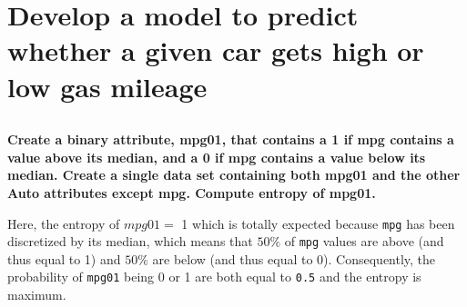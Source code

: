 \documentclass[
  12pt,
  oneside]{report}
\newenvironment{Shaded}{\begin{snugshade}}{\end{snugshade}}
\newcommand{\CommentTok}[1]{\textcolor[rgb]{0.56,0.35,0.01}{\textit{#1}}}
\newcommand{\DataTypeTok}[1]{\textcolor[rgb]{0.13,0.29,0.53}{#1}}
\newcommand{\DecValTok}[1]{\textcolor[rgb]{0.00,0.00,0.81}{#1}}
\newcommand{\KeywordTok}[1]{\textcolor[rgb]{0.13,0.29,0.53}{\textbf{#1}}}
\newcommand{\NormalTok}[1]{#1}
\newcommand{\OperatorTok}[1]{\textcolor[rgb]{0.81,0.36,0.00}{\textbf{#1}}}
\newcommand{\StringTok}[1]{\textcolor[rgb]{0.31,0.60,0.02}{#1}}
\begin{document}
\hypertarget{q2}{%
\chapter{Develop a model to predict whether a given car gets high or low gas mileage}\label{q2}}

\hypertarget{section-2}{%
\section{}\label{section-2}}

\textbf{Create a binary attribute, mpg01, that contains a 1 if mpg contains a value above its median,
and a 0 if mpg contains a value below its median. Create a single data set containing both mpg01 and the other Auto attributes except mpg. Compute entropy of mpg01.}

\begin{Shaded}
\end{Shaded}

Here, the entropy of \(mpg01 =\) 1 which is totally expected because \texttt{mpg} has been discretized by its median, which means that \(50\%\) of \texttt{mpg} values are above (and thus equal to 1) and \(50\%\) are below (and thus equal to 0). Consequently, the probability of \texttt{mpg01} being 0 or 1 are both equal to \texttt{0.5} and the entropy is maximum.
\end{document}
